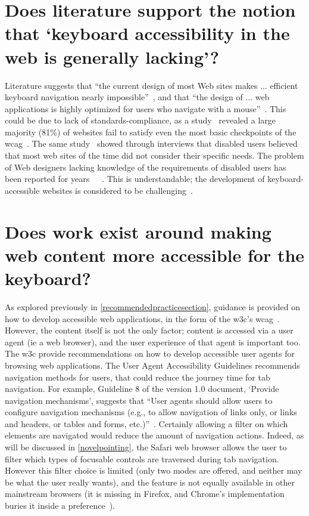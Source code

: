 \documentclass[a4paper, 12pt]{report}
\begin{document}
\section{Does literature support the notion that `keyboard accessibility in the web is generally lacking'?}
Literature suggests that ``the current design of most Web sites makes ... efficient keyboard navigation nearly impossible''~\parencite[][p.1]{schrepp2006efficiency}, and that ``the design of ... web applications is highly optimized for users who navigate with a mouse''~\parencite[][p.1]{schrepp2006efficiency}. This could be due to lack of standards-compliance, as a \citeyear{disability2004web} study~\cite{disability2004web} revealed a large majority (81\%) of websites fail to satisfy even the most basic checkpoints of the \gls{wcag}~\cite{chisholm2001web,wcag}. The same study~\cite{disability2004web} showed through interviews that disabled users believed that most web sites of the time did not consider their specific needs.
The problem of Web designers lacking knowledge of the requirements of disabled users has been reported for years~\cite{disability2004web}~\cite{coyne2001beyond}~\cite{velasco2001raising}. This is understandable; the development of keyboard-accessible websites is considered to be challenging~\cite{watanabe2012using}.
\section{Does work exist around making web content more accessible for the keyboard?}
\label{makingwebcontentkeyboardaccessible}
As explored previously in \cref{recommendedpracticesection}, guidance is provided on how to develop accessible web applications, in the form of the \gls{w3c}'s \gls{wcag}~\cite{chisholm2001web,wcag}. However, the content itself is not the only factor; content is accessed via a user agent (ie a web browser), and the user experience of that agent is important too. The \gls{w3c} provide recommendations on how to develop accessible user agents for browsing web applications\cite{jacobs2000user,allan2010user}. The User Agent Accessibility Guidelines recommends navigation methods for users, that could reduce the journey time for tab navigation. For example, Guideline 8 of the version 1.0 document, `Provide navigation mechanisms', suggests that ``User agents should allow users to configure navigation mechanisms (e.g., to allow navigation of links only, or links and headers, or tables and forms, etc.)''~\parencite[][p.17]{jacobs2000user}. Certainly allowing a filter on which elements are navigated would reduce the amount of navigation actions. Indeed, as will be discussed in \cref{novelpointing}, the Safari web browser allows the user to filter which types of focusable controls are traversed during tab navigation. However this filter choice is limited (only two modes are offered, and neither may be what the user really wants), and the feature is not equally available in other mainstream browsers (it is missing in Firefox, and Chrome's implementation buries it inside a preference~\cite{browserkeyboardaccess}).
\end{document}

